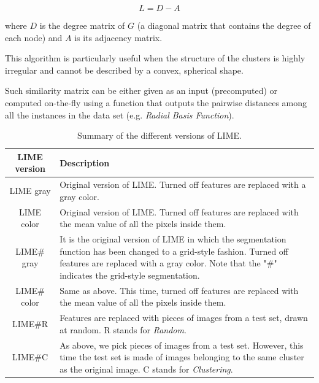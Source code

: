 \documentclass[12pt, twoside, a4paper]{report}
\begin{document}
\begin{equation}
L = D - A
\end{equation}


where $D$ is the degree matrix of $G$ (a diagonal matrix that contains the degree of each node) and $A$ is its adjacency matrix.

This algorithm is particularly useful when the structure of the clusters is highly irregular and cannot be described by a convex, spherical shape.

Such similarity matrix can be either given as an input (precomputed) or computed on-the-fly using a function that outputs the pairwise distances among all the instances in the data set (e.g. \textit{Radial Basis Function}). 



\begin{table}[]
\def\arraystretch{1.6}
\begin{tabularx}{\textwidth}{|c|X|}
\hline
\textbf{LIME version} & \textbf{Description} \\ \hline
LIME gray & Original version of LIME. Turned off features are replaced with a gray color.\\ \hline
LIME color & Original version of LIME. Turned off features are replaced with the mean value of all the pixels inside them.\\ \hline
LIME\# gray  & It is the original version of LIME in which the segmentation function has been changed to a grid-style fashion. Turned off features are replaced with a gray color. Note that the "\#" indicates the grid-style segmentation.\\ \hline
LIME\# color & Same as above. This time, turned off features are replaced with the mean value of all the pixels inside them.                                                                                                                                                         \\ \hline
LIME\#R      & Features are replaced with pieces of images from a test set, drawn at random. R stands for \textit{Random}.                                                                                                                                                                                                \\ \hline
LIME\#C      & As above, we pick pieces of images from a test set. However, this time the test set is made of images belonging to the same cluster as the original image. C stands for \textit{Clustering}.\\ \hline

\end{tabularx}
\caption{Summary of the different versions of LIME.}
\label{tab:lime_versions}
\end{table}
\bigskip
\end{document}
